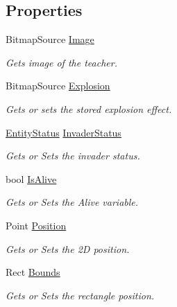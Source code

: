 \subsection*{Properties}
\begin{DoxyCompactItemize}
\item 
Bitmap\+Source \mbox{\hyperlink{class_o_e_invaders_1_1_library_1_1_teacher_ac9adffabcf8efd3e677d1e5d32d4cd25}{Image}}
\begin{DoxyCompactList}\small\item\em Gets image of the teacher. \end{DoxyCompactList}\item 
Bitmap\+Source \mbox{\hyperlink{class_o_e_invaders_1_1_library_1_1_teacher_add76d080a1441b298366ffa13f205f5b}{Explosion}}
\begin{DoxyCompactList}\small\item\em Gets or sets the stored explosion effect. \end{DoxyCompactList}\item 
\mbox{\hyperlink{namespace_o_e_invaders_1_1_library_a31b94a15c65f6baa474008cdade6bdea}{Entity\+Status}} \mbox{\hyperlink{class_o_e_invaders_1_1_library_1_1_teacher_a454af213bf6f889e3a7d847d7357f592}{Invader\+Status}}
\begin{DoxyCompactList}\small\item\em Gets or Sets the invader status. \end{DoxyCompactList}\item 
bool \mbox{\hyperlink{class_o_e_invaders_1_1_library_1_1_teacher_a520828e5af1ccaa5867df62b461550ae}{Is\+Alive}}
\begin{DoxyCompactList}\small\item\em Gets or Sets the Alive variable. \end{DoxyCompactList}\item 
Point \mbox{\hyperlink{class_o_e_invaders_1_1_library_1_1_teacher_aaddeab5618249c9a99388d5f2942c6b1}{Position}}
\begin{DoxyCompactList}\small\item\em Gets or Sets the 2D position. \end{DoxyCompactList}\item 
Rect \mbox{\hyperlink{class_o_e_invaders_1_1_library_1_1_teacher_a46be5300706e735f5d805eb9d2c9d520}{Bounds}}
\begin{DoxyCompactList}\small\item\em Gets or Sets the rectangle position. \end{DoxyCompactList}\end{DoxyCompactItemize}


